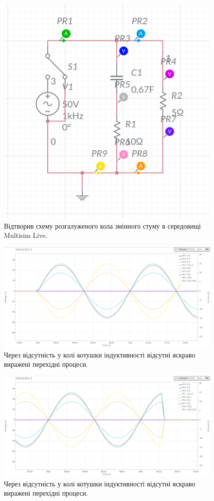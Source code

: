 \documentclass{article}
\begin{document}
\begin{normalsize}
	\begin{figure}[H]
		\centering
		\includegraphics[scale=0.5]{s2}
		\caption{Відтворив схему розгалуженого кола змінного стуму в середовищі Multisim Live.}
	\end{figure}
	
	\begin{figure}[H]
		\centering
		\includegraphics[width=\textwidth]{331}
		\caption{Через відсутність у колі котушки індуктивності відсутні яскраво виражені перехідні процеси.}
	\end{figure}

	\begin{figure}[H]
		\centering
		\includegraphics[width=\textwidth]{332}
		\caption{Через відсутність у колі котушки індуктивності відсутні яскраво виражені перехідні процеси.}
	\end{figure}
	

\end{normalsize}
\end{document}
